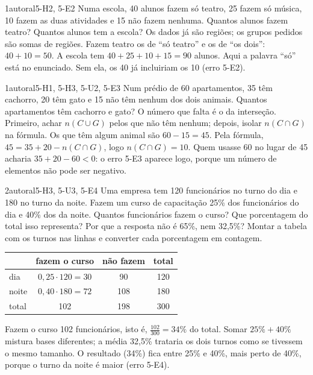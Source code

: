 \begin{exemplo}{}{1}{autoral}{5-H2, 5-E2}
\label{ex:u5:teatro}
Numa escola, 40 alunos fazem só teatro, 25 fazem só música, 10 fazem as duas atividades e 15 não fazem nenhuma. Quantos alunos fazem teatro? Quantos alunos tem a escola?
\plano Os dados já são regiões; os grupos pedidos são somas de regiões.
\resolucao Fazem teatro os de \enquote{só teatro} e os de \enquote{os dois}: $40+10=50$. A escola tem $40+25+10+15=90$ alunos.
\comentario Aqui a palavra \enquote{só} está no enunciado. Sem ela, os 40 já incluiriam os 10 (erro 5-E2).
\end{exemplo}

\begin{exemplo}{}{1}{autoral}{5-H1, 5-H3, 5-U2, 5-E3}
\label{ex:u5:predio}
Num prédio de 60 apartamentos, 35 têm cachorro, 20 têm gato e 15 não têm nenhum dos dois animais. Quantos apartamentos têm cachorro e gato?
\plano O número que falta é o da interseção. Primeiro, achar $n(C\cup G)$ pelos que não têm nenhum; depois, isolar $n(C\cap G)$ na fórmula.
\resolucao Os que têm algum animal são $60-15=45$. Pela fórmula, $45=35+20-n(C\cap G)$, logo $n(C\cap G)=10$.
\comentario Quem usasse 60 no lugar de 45 acharia $35+20-60<0$: o erro 5-E3 aparece logo, porque um número de elementos não pode ser negativo.
\end{exemplo}

\begin{exemplo}{}{2}{autoral}{5-H3, 5-U3, 5-E4}
\label{ex:u5:turnos}
Uma empresa tem 120 funcionários no turno do dia e 180 no turno da noite. Fazem um curso de capacitação 25\% dos funcionários do dia e 40\% dos da noite. Quantos funcionários fazem o curso? Que porcentagem do total isso representa? Por que a resposta não é 65\%, nem 32,5\%?
\plano Montar a tabela com os turnos nas linhas e converter cada porcentagem em contagem.
\resolucao
\begin{center}
\begin{tabular}{l|cc|c}
 & fazem o curso & não fazem & total\\\hline
dia & $0{,}25\cdot120=30$ & 90 & 120\\
noite & $0{,}40\cdot180=72$ & 108 & 180\\\hline
total & 102 & 198 & 300
\end{tabular}
\end{center}
Fazem o curso 102 funcionários, isto é, $\frac{102}{300}=34\%$ do total. Somar $25\%+40\%$ mistura bases diferentes; a média 32,5\% trataria os dois turnos como se tivessem o mesmo tamanho.
\comentario O resultado (34\%) fica entre 25\% e 40\%, mais perto de 40\%, porque o turno da noite é maior (erro 5-E4).
\end{exemplo}

